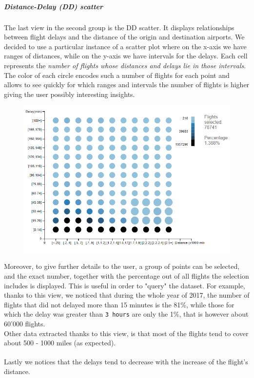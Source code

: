 \documentclass[a4paper, 12pt]{article}
\begin{document}
\subparagraph{Distance-Delay (DD) scatter} 
The last view in the second group is the DD scatter. It displays relationships between flight delays and
the distance of the origin and destination airports.
We decided to use a particular instance of a scatter plot where on the x-axis we have ranges of 
distances, while on the y-axis we have intervals for the delays. Each cell represents the 
\textit{number of flights whose distances and delays lie in those intervals}.
The color of each circle encodes such a number of flights for each point and allows to see quickly
for which ranges and intervals the number of flights is higher giving the user possibly interesting
insights.
\\
\begin{figure}[h]	
\centering
\includegraphics[scale=0.7]{ddscat.PNG}
\end{figure}
Moreover, to give further details to the user, a group of points can be selected, and the exact number,
together with the percentage out of all flights the selection includes is displayed. This is useful in
order to "query" the dataset. For example, thanks to this view, we noticed that during the whole year of
2017, the number of flights that did not delayed more than 15 minutes is the 81\%, while those for which
the delay was greater than \texttt{3 hours} are only the 1\%, that is however about 60'000 flights.
\\
Other data extracted thanks to this view, is that most of the flights tend to cover about 500 - 1000
miles (as expected).
\\
\\
Lastly we notices that the delays tend to decrease with the increase of the flight's distance. 
\end{document}
